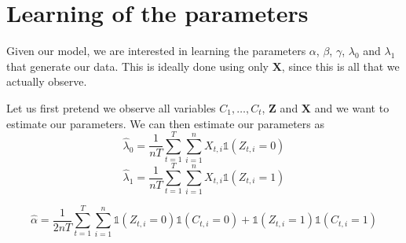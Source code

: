 \section{Learning of the parameters}

Given our model, we are interested in learning the parameters $\alpha$, $\beta$, $\gamma$, $\lambda_0$ and $\lambda_1$ that generate our data. This is ideally done using only $\pmb X$, since this is all that we actually observe. 

Let us first pretend we observe all variables $C_1, \ldots, C_t$, $\pmb Z$ and $\pmb X$ and we want to estimate our parameters. We can then estimate our parameters as
\[\hat \lambda_0 = \frac{1}{nT} \sum_{t=1}^T \sum_{i=1}^n X_{t,i} \mathbb{1} (Z_{t,i} = 0)\]
\[\hat \lambda_1 = \frac{1}{nT} \sum_{t=1}^T \sum_{i=1}^n X_{t,i} \mathbb{1} (Z_{t,i} = 1)\]

\[\hat \alpha = \frac{1}{2nT} \sum_{t=1}^T \sum_{i=1}^n \mathbb{1} (Z_{t,i} = 0 ) \mathbb{1} (C_{t,i} = 0 )  + \mathbb 1 (Z_{t,i} = 1) \mathbb{1} (C_{t,i} = 1 )\]

